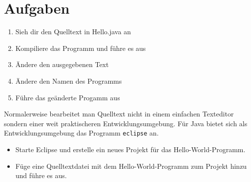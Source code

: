 \section {Aufgaben}
\begin{enumerate}
\item Sieh dir den Quelltext in Hello.java an
\item Kompiliere das Programm und führe es aus
\item Ändere den ausgegebenen Text
\item Ändere den Namen des Programms
\item Führe das geänderte Progamm aus
\end{enumerate}

Normalerweise bearbeitet man Quelltext nicht in einem einfachen Texteditor sondern einer weit praktischeren Entwicklungsumgebung.
Für Java bietet sich als Entwicklungsumgebung das Programm \lstinline$eclipse$ an.
\begin{itemize}
\item Starte Eclipse und erstelle ein neues Projekt für das Hello-World-Programm.
\item Füge eine Quelltextdatei mit dem Hello-World-Programm zum Projekt hinzu und führe es aus.
\end{itemize}
